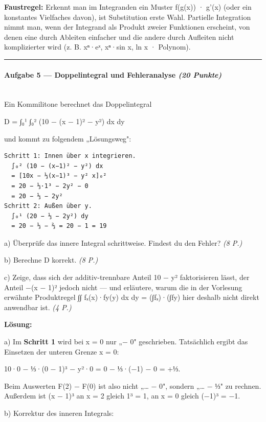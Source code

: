 \documentclass[11pt, a4paper]{article}
\begin{document}
\textbf{Faustregel:} Erkennt man im Integranden ein Muster f(g(x)) · g'(x) (oder ein konstantes Vielfaches davon), ist Substitution erste Wahl. Partielle Integration nimmt man, wenn der Integrand als Produkt zweier Funktionen erscheint, von denen eine durch Ableiten einfacher und die andere durch Aufleiten nicht komplizierter wird (z. B. xⁿ·eˣ, xⁿ·sin x, ln x · Polynom).



\noindent\textcolor{rulegray}{\rule{\linewidth}{0.4pt}}


\paragraph{Aufgabe 5 — Doppelintegral und Fehleranalyse \textit{(20 Punkte)}}\mbox{}\\[2pt]

Ein Kommilitone berechnet das Doppelintegral


D = ∫₀¹ ∫₀² (10 − (x − 1)² − y²) dx dy


und kommt zu folgendem „Lösungsweg":


\begin{lstlisting}
Schritt 1: Innen über x integrieren.
  ∫₀² (10 − (x−1)² − y²) dx
  = [10x − ⅓(x−1)³ − y² x]₀²
  = 20 − ⅓·1³ − 2y² − 0
  = 20 − ⅓ − 2y²
Schritt 2: Außen über y.
  ∫₀¹ (20 − ⅓ − 2y²) dy
  = 20 − ⅓ − ⅔ = 20 − 1 = 19
\end{lstlisting}


a) Überprüfe das innere Integral schrittweise. Findest du den Fehler? \textit{(8 P.)}


b) Berechne D korrekt. \textit{(8 P.)}


c) Zeige, dass sich der additiv-trennbare Anteil 10 − y² faktorisieren lässt, der Anteil −(x − 1)² jedoch nicht — und erläutere, warum die in der Vorlesung erwähnte Produktregel ∫∫ fₓ(x)·fy(y) dx dy = (∫fₓ)·(∫fy) hier deshalb nicht direkt anwendbar ist. \textit{(4 P.)}


\textbf{Lösung:}


a) Im \textbf{Schritt 1} wird bei x = 0 nur „− 0" geschrieben. Tatsächlich ergibt das Einsetzen der unteren Grenze x = 0:

10·0 − ⅓·(0 − 1)³ − y²·0 = 0 − ⅓·(−1) − 0 = +⅓.

Beim Auswerten F(2) − F(0) ist also nicht „… − 0", sondern „… − ⅓" zu rechnen. Außerdem ist (x − 1)³ an x = 2 gleich 1³ = 1, an x = 0 gleich (−1)³ = −1.


b) Korrektur des inneren Integrals:
\end{document}
